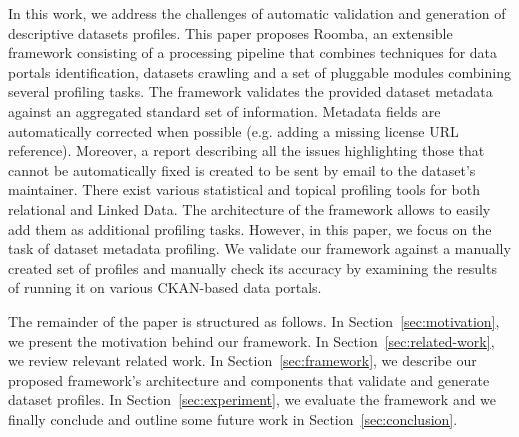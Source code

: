\documentclass[runningheads,a4paper]{llncs}
\begin{document}
In this work, we address the challenges of automatic validation and generation of descriptive datasets profiles. This paper proposes Roomba, an extensible framework consisting of a processing pipeline that combines techniques for data portals identification, datasets crawling and a set of pluggable modules combining several profiling tasks. The framework validates the provided dataset metadata against an aggregated standard set of information. Metadata fields are automatically corrected when possible (e.g. adding a missing license URL reference). Moreover, a report describing all the issues highlighting those that cannot be automatically fixed is created to be sent by email to the dataset's maintainer. There exist various statistical and topical profiling tools for both relational and Linked Data. The architecture of the framework allows to easily add them as additional profiling tasks. However, in this paper, we focus on the task of dataset metadata profiling. We validate our framework against a manually created set of profiles and manually check its accuracy by examining the results of running it on various CKAN-based data portals.

The remainder of the paper is structured as follows. In Section~\ref{sec:motivation}, we present the motivation behind our framework. In Section~\ref{sec:related-work}, we review relevant related work. In Section~\ref{sec:framework}, we describe our proposed framework's architecture and components that validate and generate dataset profiles. In Section~\ref{sec:experiment}, we evaluate the framework and we finally conclude and outline some future work in Section~\ref{sec:conclusion}.

\end{document}
